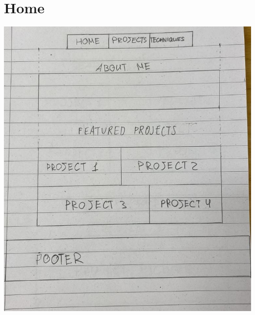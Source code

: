 \documentclass{TDP003mall}
\begin{document}
\section{Home}
\begin{center}
\includegraphics[scale=0.35]{Home.jpg}
\end{center}
\end{document}
